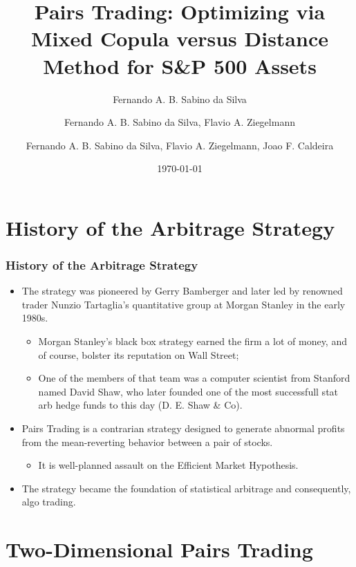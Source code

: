 \documentclass[pdf,9pt,xcolor=dvipsnames,hide notes]{beamer}
\title[PPGE/UFRGS]{Pairs Trading: Optimizing via Mixed Copula versus Distance Method for S\&P 500 Assets }
\author[Fernando A. B. Sabino da Silva]{Fernando A. B. Sabino da Silva\inst{1}}
\author[Flavio A. Ziegelmann]{Fernando A. B. Sabino da Silva\inst{1,2}, Flavio A. Ziegelmann\inst{1,2}}
\author[Joao F. Caldeira]{Fernando A. B. Sabino da Silva\inst{1}, Flavio A. Ziegelmann\inst{1,2}, Joao F. Caldeira\inst{2}}
\institute[Department of Statistics/UFRGS, PPGE/UFRGS]{\inst{1} Department of Statistics/UFRGS, \inst{2} PPGE/UFRGS}
\date{\today} %
\begin{document}
	\justifying
	
	\frame{\titlepage}
	
		\section{History of the Arbitrage Strategy}
	
	\begin{frame}[label=frame1]
	\frametitle{History of the Arbitrage Strategy}
	
	\begin{itemize}
		\justifying
		
		\item The strategy was pioneered by Gerry Bamberger and later led by renowned trader Nunzio Tartaglia's quantitative group at Morgan Stanley in the early 1980s.
			\begin{itemize}
				\item Morgan Stanley's black box strategy earned the firm a lot of money, and of course, bolster its reputation on Wall Street;
				\item One of the members of that team was a computer scientist from Stanford named David Shaw, who later founded one of the most successfull stat arb hedge funds to this day (D. E. Shaw \& Co).
			\end{itemize}
		
		\vspace{0.3cm}
		
		\item Pairs Trading is a contrarian strategy designed to generate abnormal profits from the mean-reverting behavior between a pair of stocks. 
			\begin{itemize} 
				\item It is well-planned assault on the Efficient Market Hypothesis.
			\end{itemize}
		
		\vspace{0.3cm}
		
		\item The strategy became the foundation of statistical arbitrage and consequently, algo trading.
		
	\end{itemize}	
\end{frame}
	
		\section{Two-Dimensional Pairs Trading}	
\end{document}
